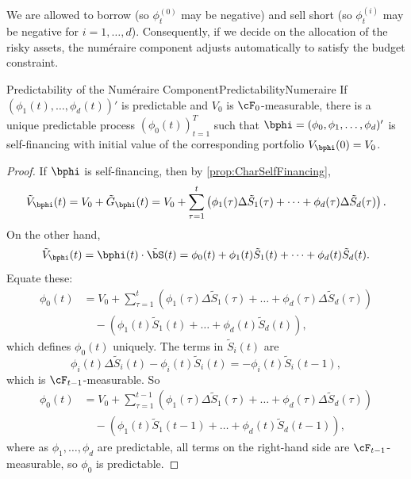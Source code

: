 We are allowed to borrow (so $\phi_t^{(0)}$ may be negative) and sell short (so $\phi_t^{(i)}$ may be negative for $i = 1, \dots, d$). Consequently, if we decide on the allocation of the risky assets, the num\'{e}raire component adjusts automatically to satisfy the budget constraint.

\begin{prop}{Predictability of the Num\'{e}raire Component}{PredictabilityNumeraire}
	If $(\phi_1(t), \dots, \phi_d(t))'$ is predictable and $V_0$ is $\cF_0$-measurable, there is a unique predictable process $(\phi_0(t))_{t=1}^T$ such that $\bphi = (\phi_0, \phi_1, \dots, \phi_d)'$ is self-financing with initial value of the corresponding portfolio $V_{\bphi}(0) = V_0$.
\end{prop}

\begin{proof}
	If $\bphi$ is self-financing, then by \cref{prop:CharSelfFinancing},
	\begin{equation*}
		\tilde{V}_{\bphi}(t) = V_0 + \tilde{G}_{\bphi}(t) = V_0 + \sum_{\tau=1}^t \left( \phi_1(\tau) \Delta \tilde{S}_1(\tau) + \dots + \phi_d(\tau) \Delta \tilde{S}_d(\tau) \right).
	\end{equation*}
	On the other hand,
	\begin{equation*}
		\tilde{V}_{\bphi}(t) = \bphi(t) \cdot \tilde{\bS}(t) = \phi_0(t) + \phi_1(t) \tilde{S}_1(t) + \dots + \phi_d(t) \tilde{S}_d(t).
	\end{equation*}
	Equate these:
	\begin{align*}
		\phi_0(t) & = V_0 + \sum_{\tau=1}^t \left( \phi_1(\tau) \Delta \tilde{S}_1(\tau) + \dots + \phi_d(\tau) \Delta \tilde{S}_d(\tau) \right) \\
		          & \quad - \left( \phi_1(t) \tilde{S}_1(t) + \dots + \phi_d(t) \tilde{S}_d(t) \right),
	\end{align*}
	which defines $\phi_0(t)$ uniquely. The terms in $\tilde{S}_i(t)$ are
	\begin{equation*}
		\phi_i(t) \Delta \tilde{S}_i(t) - \phi_i(t) \tilde{S}_i(t) = -\phi_i(t) \tilde{S}_i(t-1),
	\end{equation*}
	which is $\cF_{t-1}$-measurable. So
	\begin{align*}
		\phi_0(t) & = V_0 + \sum_{\tau=1}^{t-1} \left( \phi_1(\tau) \Delta \tilde{S}_1(\tau) + \dots + \phi_d(\tau) \Delta \tilde{S}_d(\tau) \right) \\
		          & \quad - \left( \phi_1(t) \tilde{S}_1(t-1) + \dots + \phi_d(t) \tilde{S}_d(t-1) \right),
	\end{align*}
	where as $\phi_1, \dots, \phi_d$ are predictable, all terms on the right-hand side are $\cF_{t-1}$-measurable, so $\phi_0$ is predictable.
\end{proof}

